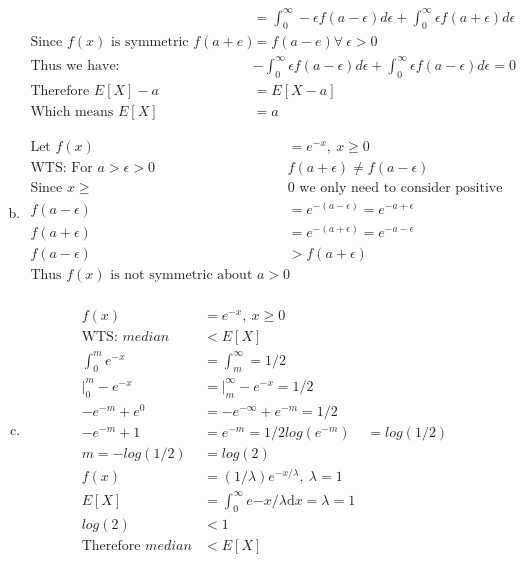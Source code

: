 \documentclass{article}
\newcommand{\dx}{\mathrm{d}x}
\begin{document}
\begin{flushleft}
\begin{enumerate}[(a)]
\begin{align*}
&=\int_{0}^{\infty} -\epsilon f(a-\epsilon) d\epsilon + \int_{0}^{\infty} \epsilon f(a+\epsilon) d\epsilon\\
\text{Since } f(x) \text{ is symmetric } f(a+e)&=f(a-e) \forall \ \epsilon > 0\\
\text{Thus we have: }& -\int_{0}^{\infty} \epsilon f(a-\epsilon) d\epsilon + \int_{0}^{\infty} \epsilon f(a-\epsilon) d\epsilon=0\\
\text{Therefore } E[X]-a&=E[X-a]\\
\text{Which means } E[X]&=a
\end{align*}
\item
\begin{align*}
\text{Let } f(x)&=e^{-x}, \ x\geq 0\\
\text{WTS: For } a>\epsilon>0 \ &  f(a+\epsilon)\neq f(a-\epsilon)\\
\text{Since } x\geq& 0 \text{ we only need to consider positive a}\\
f(a-\epsilon)&=e^{-(a-\epsilon)}=e^{-a+\epsilon}\\
f(a+\epsilon)&=e^{-(a+\epsilon)}=e^{-a-\epsilon}\\
f(a-\epsilon)&>f(a+\epsilon)\\
\text{Thus } f(x) \text{ is not symmetric about } a>0\\
\end{align*}
\item
\begin{align*}
f(x)&=e^{-x}, \ x\geq 0\\
\text{WTS: } median&< E[X]\\
\int_{0}^{m}e^{-x}&=\int_{m}^{\infty}=1/2\\
\bigg|_{0}^{m}-e^{-x}&=\bigg|_{m}^{\infty}-e^{-x}=1/2\\
-e^{-m}+e^0&=-e^{-\infty}+e^{-m}=1/2\\
-e^{-m}+1&=e^{-m}=1/2
log(e^{-m})&=log(1/2)\\
m=-log(1/2)&=log(2)\\
f(x)&=(1/\lambda)e^{-x/ \lambda}, \ \lambda=1\\
E[X]&=\int_{0}^{\infty}e{-x/\lambda} \dx=\lambda=1\\
log(2)&<1 \\
\text{Therefore } median&<E[X]
\end{align*}
\end{enumerate}

\end{flushleft}
\end{document}
